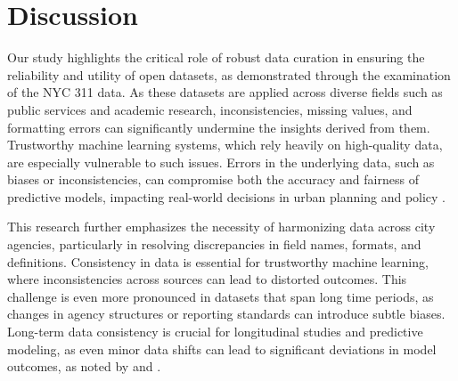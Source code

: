 \documentclass[linenumber]{jdsart}
\begin{document}


\section{Discussion} \label{sec:discussion}

Our study highlights the critical role of robust data curation in
ensuring the reliability and utility of open datasets, as demonstrated
through the examination of the NYC 311 data. As these datasets are
applied across diverse fields such as public services and academic
research, inconsistencies, missing values, and formatting errors can
significantly undermine the insights derived from them. Trustworthy
machine learning systems, which rely heavily on high-quality data, are
especially vulnerable to such issues. Errors in the underlying data,
such as biases or inconsistencies, can compromise both the accuracy
and fairness of predictive models, impacting real-world decisions in
urban planning and policy \citep{rahm2000data, geiger2020garbage}.


This research further emphasizes the necessity of harmonizing data
across city agencies, particularly in resolving discrepancies in field
names, formats, and definitions. Consistency in data is essential for
trustworthy machine learning, where inconsistencies across sources can
lead to distorted outcomes. This challenge is even more pronounced in
datasets that span long time periods, as changes in agency structures
or reporting standards can introduce subtle biases. Long-term data
consistency is crucial for longitudinal studies and predictive
modeling, as even minor data shifts can lead to significant deviations
in model outcomes, as noted by \citet{rahm2000data} and
\citet{borgman2012conundrum}.
\end{document}
